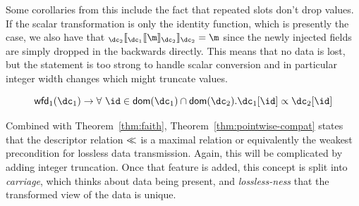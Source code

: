 Some corollaries from this include the fact that repeated slots don't drop
values. If the scalar transformation is only the identity function, which is
presently the case, we also have that
$\coercion{\dc_2}{\coercion{\dc_1}{\m}{\dc_2}}{\dc_{2}} = \m$ since the newly injected
fields are simply dropped in the backwards directly. This means that no data is
lost, but the statement is too strong to handle scalar conversion and in
particular integer width changes which might truncate values.

\vspace{1em}
\begin{theorem}\label{thm:pointwise-compat}
  \[ \wfd{\dc_1} \rightarrow \forall\ \id \in \dom{\dc_1} \cap \dom{\dc_2}. \dc_1[\id] \fieldrel \dc_2[\id] \]
\end{theorem}

Combined with Theorem~\ref{thm:faith}, Theorem~\ref{thm:pointwise-compat} states
that the descriptor relation $\ll$ is a maximal relation or equivalently
the weakest precondition for lossless data transmission. Again, this will be
complicated by adding integer truncation. Once that feature is added, this
concept is split into \emph{carriage}, which thinks about data being present,
and \emph{lossless-ness} that the transformed view of the data is unique.

